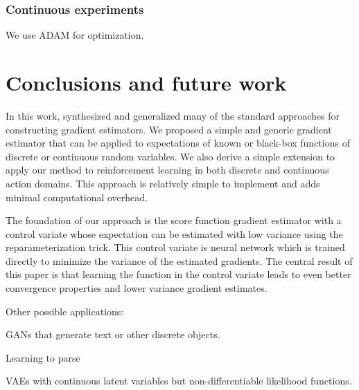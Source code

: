 \documentclass{article}
\begin{document}

\subsubsection{Continuous experiments}
We use ADAM \citep{kingma2015adam} for optimization.


\section{Conclusions and future work}
\label{conclusion}

In this work, synthesized and generalized many of the standard approaches for constructing gradient estimators.
We proposed a simple and generic gradient estimator that can be applied to expectations of known or black-box functions of discrete or continuous random variables. We also derive a simple extension to apply our method to reinforcement learning in both discrete and continuous action domains. 
This approach is relatively simple to implement and adds minimal computational overhead. 

The foundation of our approach is the score function gradient estimator with a control variate whose expectation can be estimated with low variance using the reparameterization trick.
This control variate is neural network which is trained directly to minimize the variance of the estimated gradients.
The central result of this paper is that learning the function in the control variate leads to even better convergence properties and lower variance gradient estimates. 


Other possible applications:

GANs \citep{goodfellow2014generative} that generate text or other discrete objects.

Learning to parse \citep{kusner2017grammar}

VAEs with continuous latent variables but non-differentiable likelihood functions.








\end{document}
